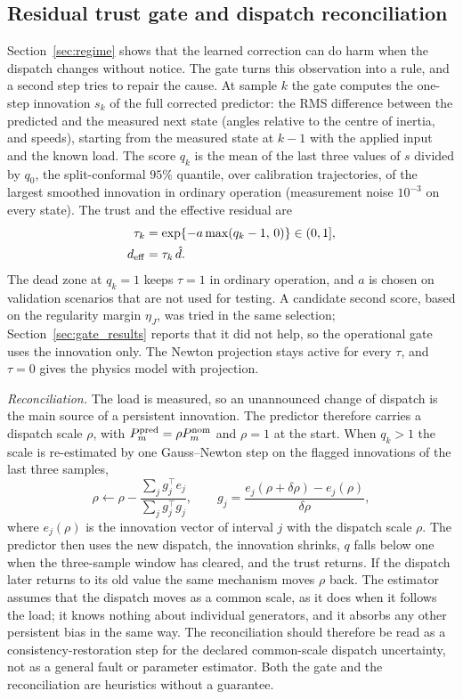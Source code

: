 \documentclass[preprint,12pt]{elsarticle}
\begin{document}
\subsection{Residual trust gate and dispatch reconciliation}
\label{sec:gate}
Section~\ref{sec:regime} shows that the learned correction can do harm when the dispatch changes without notice. The gate turns this observation into a rule, and a second step tries to repair the cause. At sample $k$ the gate computes the one-step innovation $s_k$ of the full corrected predictor: the RMS difference between the predicted and the measured next state (angles relative to the centre of inertia, and speeds), starting from the measured state at $k-1$ with the applied input and the known load. The score $q_k$ is the mean of the last three values of $s$ divided by $q_0$, the split-conformal $95\%$ quantile, over calibration trajectories, of the largest smoothed innovation in ordinary operation (measurement noise $10^{-3}$ on every state). The trust and the effective residual are
\begin{equation}
\begin{split}\tau_k&=\exp\{-a\max(q_k-1,\,0)\}\in(0,1],\\ d_{\rm eff}&=\tau_k\,\hat d .\end{split}
\label{eq:gate}
\end{equation}
The dead zone at $q_k=1$ keeps $\tau=1$ in ordinary operation, and $a$ is chosen on validation scenarios that are not used for testing. A candidate second score, based on the regularity margin $\eta_J$, was tried in the same selection; Section~\ref{sec:gate_results} reports that it did not help, so the operational gate uses the innovation only. The Newton projection stays active for every $\tau$, and $\tau=0$ gives the physics model with projection.

\emph{Reconciliation.} The load is measured, so an unannounced change of dispatch is the main source of a persistent innovation. The predictor therefore carries a dispatch scale $\rho$, with $P_m^{\rm pred}=\rho P_m^{\rm nom}$ and $\rho=1$ at the start. When $q_k>1$ the scale is re-estimated by one Gauss--Newton step on the flagged innovations of the last three samples,
\begin{equation}
\rho\leftarrow\rho-\frac{\sum_j g_j^\top e_j}{\sum_j g_j^\top g_j},\qquad g_j=\frac{e_j(\rho+\delta\rho)-e_j(\rho)}{\delta\rho},
\label{eq:rho}
\end{equation}
where $e_j(\rho)$ is the innovation vector of interval $j$ with the dispatch scale $\rho$. The predictor then uses the new dispatch, the innovation shrinks, $q$ falls below one when the three-sample window has cleared, and the trust returns. If the dispatch later returns to its old value the same mechanism moves $\rho$ back. The estimator assumes that the dispatch moves as a common scale, as it does when it follows the load; it knows nothing about individual generators, and it absorbs any other persistent bias in the same way. The reconciliation should therefore be read as a consistency-restoration step for the declared common-scale dispatch uncertainty, not as a general fault or parameter estimator. Both the gate and the reconciliation are heuristics without a guarantee.
\end{document}
